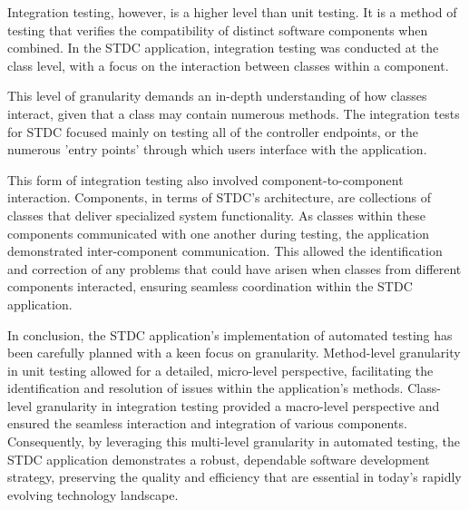 \begin{justify}
\vspace{0.25cm}
\newendline Integration testing, however, is a higher level than unit testing. It is a method of testing that verifies the compatibility of distinct software components when combined. In the STDC application, integration testing was conducted at the class level, with a focus on the interaction between classes within a component.

\vspace{0.25cm}
\newendline This level of granularity demands an in-depth understanding of how classes interact, given that a class may contain numerous methods. The integration tests for STDC focused mainly on testing all of the controller endpoints, or the numerous 'entry points' through which users interface with the application.

\vspace{0.25cm}
\newendline This form of integration testing also involved component-to-component interaction. Components, in terms of STDC's architecture, are collections of classes that deliver specialized system functionality. As classes within these components communicated with one another during testing, the application demonstrated inter-component communication. This allowed the identification and correction of any problems that could have arisen when classes from different components interacted, ensuring seamless coordination within the STDC application.

\vspace{0.25cm}
\newendline In conclusion, the STDC application's implementation of automated testing has been carefully planned with a keen focus on granularity. Method-level granularity in unit testing allowed for a detailed, micro-level perspective, facilitating the identification and resolution of issues within the application's methods. Class-level granularity in integration testing provided a macro-level perspective and ensured the seamless interaction and integration of various components. Consequently, by leveraging this multi-level granularity in automated testing, the STDC application demonstrates a robust, dependable software development strategy, preserving the quality and efficiency that are essential in today's rapidly evolving technology landscape.
\end{justify}
\clearpage


\vspace{0.25cm}
